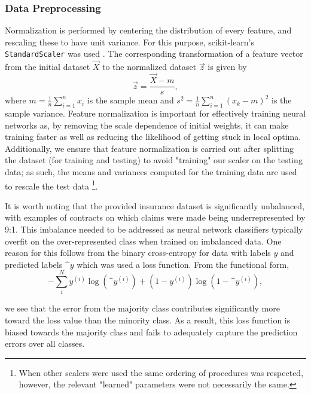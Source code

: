 \subsubsection*{Data Preprocessing}
Normalization is performed by centering the distribution of every feature, and rescaling these to have unit variance. For this purpose, scikit-learn's \texttt{StandardScaler} was used \cite{scikit}. The corresponding transformation of a feature vector from the initial dataset $\vec{X}$ to the normalized dataset $\vec{z}$ is given by
\begin{equation}
\vec{z} = \frac{\vec{X}-m}{s},
\end{equation}
\noindent where $m=\frac{1}{n}\sum_{i=1}^{n}x_{i}$ is the sample mean and $s^2=\frac{1}{n} \sum_{i=1}^{n}{(x_{k}-m)}^2$ is the sample variance. Feature normalization is important for effectively training neural networks as, by removing the scale dependence of initial weights, it can make training faster as well as reducing the likelihood of getting stuck in local optima. Additionally, we ensure that feature normalization is carried out after splitting the dataset (for training and testing) to avoid "training" our scaler on the testing data; as such, the means and variances computed for the training data are used to rescale the test data \footnote{When other scalers were used the same ordering of procedures was respected, however, the relevant "learned" parameters were not necessarily the same.}.

It is worth noting that the provided insurance dataset is significantly unbalanced, with examples of contracts on which claims were made being underrepresented by 9:1. This imbalance needed to be addressed as neural network classifiers typically overfit on the over-represented class when trained on imbalanced data. One reason for this follows from the binary cross-entropy for data with labels $y$ and predicted labels $\^y$ which was used a loss function. From the functional form, 
\begin{equation}
-\sum_{i}^{N}y^{(i)}\log(\^{y}^{(i)})+(1-y^{(i)})\log(1-\^{y}^{(i)}),
\end{equation}

\noindent we see that the error from the majority class contributes significantly more toward the loss value than the minority class. As a result, this loss function is biased towards the majority class and fails to adequately capture the prediction errors over all classes.

